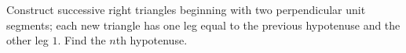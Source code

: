 Construct successive right triangles beginning with two perpendicular unit segments; each new triangle has one leg equal to the previous hypotenuse and the other leg $1$. Find the $n$th hypotenuse.
